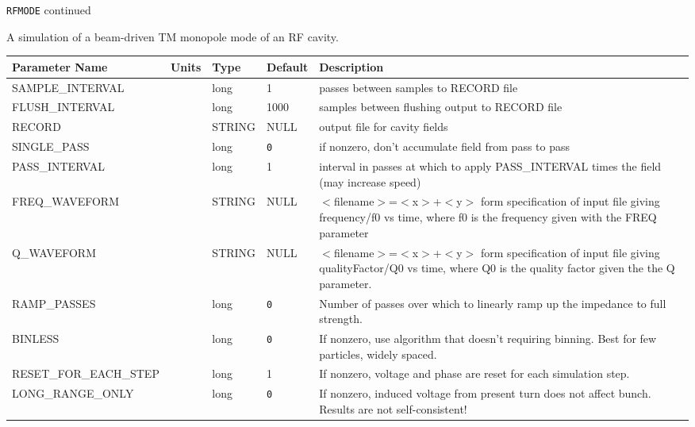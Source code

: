 \newpage
\begin{center}{\Large\verb|RFMODE| continued}\end{center}
A simulation of a beam-driven TM monopole mode of an RF cavity.
\\
\begin{tabular}{|l|l|l|l|p{\descwidth}|} \hline
Parameter Name & Units & Type & Default & Description \\ \hline 
SAMPLE\_INTERVAL &  & long &   1               & passes between samples to RECORD file  \\ \hline 
FLUSH\_INTERVAL &  & long &   1000            & samples between flushing output to RECORD file  \\ \hline 
RECORD &  & STRING &   NULL            & output file for cavity fields  \\ \hline 
SINGLE\_PASS &  & long &  \verb|0| & if nonzero, don't accumulate field from pass to pass  \\ \hline 
PASS\_INTERVAL &  & long &   1               & interval in passes at which to apply PASS\_INTERVAL times the field (may increase speed)  \\ \hline 
FREQ\_WAVEFORM &  & STRING &   NULL            & $<$filename$>$=$<$x$>$+$<$y$>$ form specification of input file giving frequency/f0 vs time, where f0 is the frequency given with the FREQ parameter  \\ \hline 
Q\_WAVEFORM &  & STRING &   NULL            & $<$filename$>$=$<$x$>$+$<$y$>$ form specification of input file giving qualityFactor/Q0 vs time, where Q0 is the quality factor given the the Q parameter.  \\ \hline 
RAMP\_PASSES &  & long &  \verb|0| & Number of passes over which to linearly ramp up the impedance to full strength.  \\ \hline 
BINLESS &  & long &  \verb|0| & If nonzero, use algorithm that doesn't requiring binning.  Best for few particles, widely spaced.  \\ \hline 
RESET\_FOR\_EACH\_STEP &  & long &   1               & If nonzero, voltage and phase are reset for each simulation step.  \\ \hline 
LONG\_RANGE\_ONLY &  & long &  \verb|0| & If nonzero, induced voltage from present turn does not affect bunch. Results are not self-consistent!  \\ \hline 
\end{tabular}

